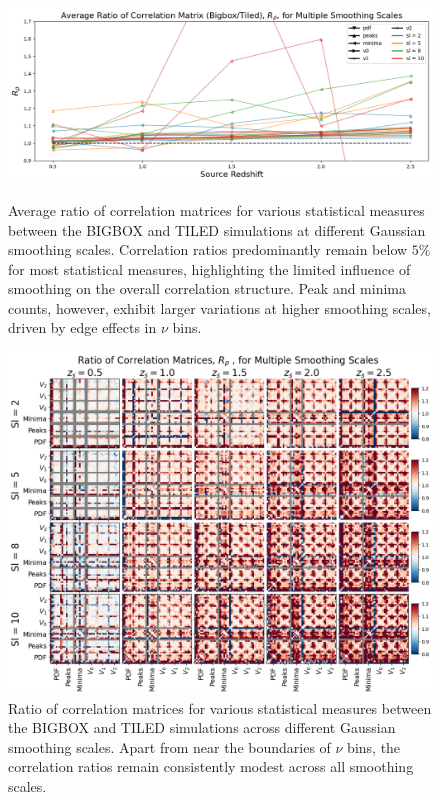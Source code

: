 \begin{figure}[p]
    \centering
    \includegraphics[width=\textwidth]{figures/results/avg_corr_ratio_sl.png}
    \caption[Average BIGBOX/TILED Ratio of Correlation for Multiple Smoothing Scales]
    {Average ratio of correlation matrices for various statistical measures between the BIGBOX and TILED simulations at different Gaussian smoothing scales. Correlation ratios predominantly remain below $5\%$ for most statistical measures, highlighting the limited influence of smoothing on the overall correlation structure. Peak and minima counts, however, exhibit larger variations at higher smoothing scales, driven by edge effects in $\nu$ bins.}
    \label{fig:avg_corr_sl}
    \includegraphics[width=\textwidth]{figures/results/corr_smoothing.png}
    \caption[BIGBOX/TILED Ratio of Correlation for Multiple Smoothing Scales]
    {Ratio of correlation matrices for various statistical measures between the BIGBOX and TILED simulations across different Gaussian smoothing scales. Apart from near the boundaries of $\nu$ bins, the correlation ratios remain consistently modest across all smoothing scales.} 
    \label{fig:corr_smoothing}
\end{figure}


